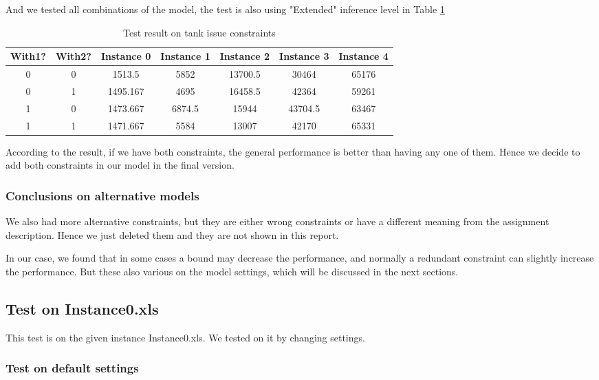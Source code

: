 \documentclass[a4paper, 12pt]{article}
\begin{document}
And we tested all combinations of the model, the test is also using "Extended" inference level in Table \ref{tankissue}
\begin{table}
    \centering
    \caption{Test result on tank issue constraints}
    \label{tankissue}
    \begin{tabular}{|c|c|c|c|c|c|c|}
    \hline
    With1? & With2? & Instance 0 & Instance 1 & Instance 2 & Instance 3 & Instance 4 \\
    \hline
    0 & 0 & 1513.5 & 5852 & 13700.5 & 30464 & 65176 \\
    \hline
    0 & 1 & 1495.167 & 4695 & 16458.5 & 42364 & 59261 \\
    \hline
    1 & 0 & 1473.667 & 6874.5 & 15944 & 43704.5 & 63467 \\
    \hline
    1 & 1 & 1471.667 & 5584 & 13007 & 42170 & 65331 \\
    \end{tabular}
\end{table}
According to the result, if we have both constraints, the general performance is better than having any one of them. Hence we decide to add both constraints in our model in the final version.

\subsubsection{Conclusions on alternative models}

We also had more alternative constraints, but they are either wrong constraints or have a different meaning from the assignment description. Hence we just deleted them and they are not shown in this report. 

In our case, we found that in some cases a bound may decrease the performance, and normally a redundant constraint can slightly increase the performance. But these also various on the model settings, which will be discussed in the next sections. 

\subsection{Test on Instance0.xls}

This test is on the given instance Instance0.xls. We tested on it by changing settings. 

\subsubsection{Test on default settings}
\end{document}
